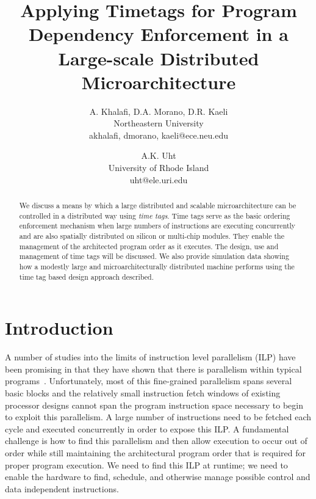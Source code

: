 \documentclass[10pt,dvips]{article}
\begin{document}
\parskip 2mm
%
%
\title{Applying Timetags for Program Dependency Enforcement
in a Large-scale Distributed Microarchitecture}
%
\author{
A. Khalafi, D.A. Morano, D.R. Kaeli\\
Northeastern University\\
akhalafi, dmorano, kaeli@ece.neu.edu\\
\and
A.K. Uht\\
University of Rhode Island\\ 
uht@ele.uri.edu
}
%
\date{}
%
\maketitle
%
%
%
\begin{abstract}
We discuss a means by which a large distributed and scalable
microarchitecture can be controlled in a distributed way using
{\em time tags}.  Time tags serve as the basic ordering enforcement mechanism
when large numbers of instructions are executing concurrently and
are also spatially distributed on silicon or multi-chip modules.
They enable the management of the architected program order as
it executes.  The design, use and management of time tags will
be discussed.  We also provide simulation data showing how a modestly large
and microarchitecturally distributed machine performs using
the time tag based design approach described.
\end{abstract}
%
%
\section{Introduction}
%
A number of studies into the limits of 
instruction level parallelism (ILP) have
been promising in that they have shown that there is parallelism within
typical programs~\cite{Gon97,Lam92,Uht95}.  
Unfortunately, most of this fine-grained
parallelism spans several basic blocks and the relatively small
instruction fetch windows of existing processor designs cannot span
the program instruction space necessary to begin to exploit this
parallelism.  A large number of instructions need to be fetched
each cycle and executed concurrently in order to expose this ILP.
A fundamental challenge 
is how to find this parallelism and then allow execution to occur
out of order  
while still maintaining the architectural program order that
is required for proper program execution.
We need to find this ILP at runtime; we need to 
enable the hardware to find, schedule,
and otherwise manage possible control and data independent instructions.
\end{document}

